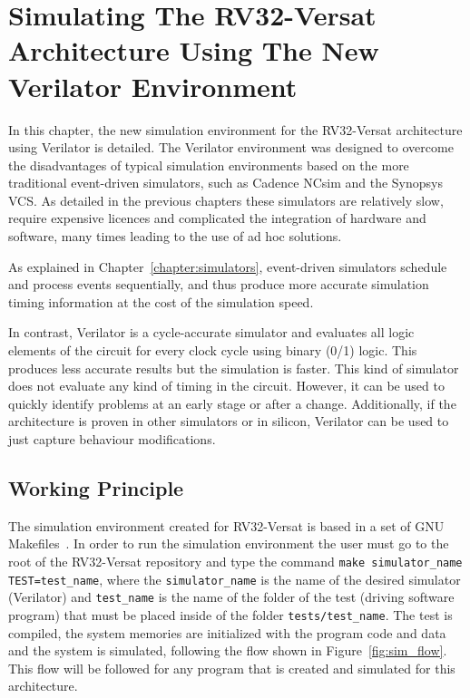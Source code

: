 \chapter{Simulating The RV32-Versat Architecture Using The New Verilator Environment}
\label{chapter:sim_verilator}

In this chapter, the new simulation environment for the RV32-Versat architecture
using Verilator is detailed. The Verilator environment was designed to overcome
the disadvantages of typical simulation environments based on the more
traditional event-driven simulators, such as Cadence NCsim and the Synopsys VCS.
As detailed in the previous chapters these simulators are relatively slow,
require expensive licences and complicated the integration of hardware and
software, many times leading to the use of ad hoc solutions.

As explained in Chapter~\ref{chapter:simulators}, event-driven simulators
schedule and process events sequentially, and thus produce more accurate
simulation timing information at the cost of the simulation speed.

In contrast, Verilator is a cycle-accurate simulator and evaluates all logic
elements of the circuit for every clock cycle using binary (0/1) logic. This
produces less accurate results but the simulation is faster. This kind of
simulator does not evaluate any kind of timing in the circuit. However, it can
be used to quickly identify problems at an early stage or after a
change. Additionally, if the architecture is proven in other simulators or in
silicon, Verilator can be used to just capture behaviour modifications.


\section{Working Principle}
\label{section:working_principle}

The simulation environment created for RV32-Versat is based in a set of GNU
Makefiles~\cite{stallman:makefile}. In order to run the simulation environment
the user must go to the root of the RV32-Versat repository and type the command
{\tt make simulator\_name TEST=test\_name}, where the {\tt simulator\_name} is
the name of the desired simulator (Verilator) and {\tt test\_name} is the name
of the folder of the test (driving software program) that must be placed inside
of the folder {\tt tests/test\_name}. The test is compiled, the system memories
are initialized with the program code and data and the system is simulated, following the 
flow shown in Figure~\ref{fig:sim_flow}. This flow will be followed for any program that 
is created and simulated for this architecture.

